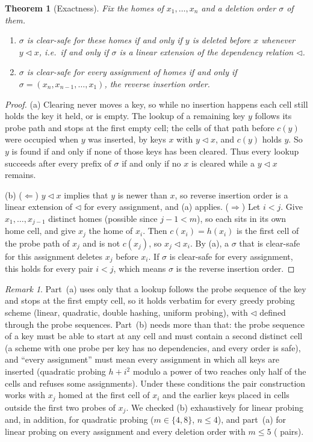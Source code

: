 \documentclass[11pt,a4paper]{article}
\newtheorem{theorem}{Theorem}
\theoremstyle{definition}
\theoremstyle{remark}
\newtheorem{remark}{Remark}
\begin{document}
\begin{theorem}[Exactness]\label{thm:exact}
Fix the homes of $x_1,\dots,x_n$ and a deletion order $\sigma$ of them.
\begin{enumerate}[label=(\alph*),leftmargin=*,nosep]
\item $\sigma$ is clear-safe for these homes if and only if $y$ is deleted before $x$ whenever $y\lhd x$, i.e.\ if and only if $\sigma$ is a linear extension of the dependency relation $\lhd$.
\item $\sigma$ is clear-safe for every assignment of homes if and only if $\sigma=(x_n,x_{n-1},\dots,x_1)$, the reverse insertion order.
\end{enumerate}
\end{theorem}
\begin{proof}
(a) Clearing never moves a key, so while no insertion happens each cell still holds the key it held, or is empty. The lookup of a remaining key $y$ follows its probe path and stops at the first empty cell; the cells of that path before $c(y)$ were occupied when $y$ was inserted, by keys $x$ with $y\lhd x$, and $c(y)$ holds $y$. So $y$ is found if and only if none of those keys has been cleared. Thus every lookup succeeds after every prefix of $\sigma$ if and only if no $x$ is cleared while a $y\lhd x$ remains.

(b) ($\Leftarrow$) $y\lhd x$ implies that $y$ is newer than $x$, so reverse insertion order is a linear extension of $\lhd$ for every assignment, and (a) applies. ($\Rightarrow$) Let $i<j$. Give $x_1,\dots,x_{j-1}$ distinct homes (possible since $j-1<m$), so each sits in its own home cell, and give $x_j$ the home of $x_i$. Then $c(x_i)=h(x_i)$ is the first cell of the probe path of $x_j$ and is not $c(x_j)$, so $x_j\lhd x_i$. By (a), a $\sigma$ that is clear-safe for this assignment deletes $x_j$ before $x_i$. If $\sigma$ is clear-safe for every assignment, this holds for every pair $i<j$, which means $\sigma$ is the reverse insertion order.
\end{proof}

\begin{remark}\label{rem:general}
Part~(a) uses only that a lookup follows the probe sequence of the key and stops at the first empty cell, so it holds verbatim for every greedy probing scheme (linear, quadratic, double hashing, uniform probing), with $\lhd$ defined through the probe sequences. Part~(b) needs more than that: the probe sequence of a key must be able to start at any cell and must contain a second distinct cell (a scheme with one probe per key has no dependencies, and every order is safe), and ``every assignment'' must mean every assignment in which all keys are inserted (quadratic probing $h+i^2$ modulo a power of two reaches only half of the cells and refuses some assignments). Under these conditions the pair construction works with $x_j$ homed at the first cell of $x_i$ and the earlier keys placed in cells outside the first two probes of $x_j$. We checked (b) exhaustively for linear probing and, in addition, for quadratic probing ($m\in\{4,8\}$, $n\le4$), and part~(a) for linear probing on every assignment and every deletion order with $m\le5$ (\SafeOrderPairs{} pairs).
\end{remark}
\end{document}
